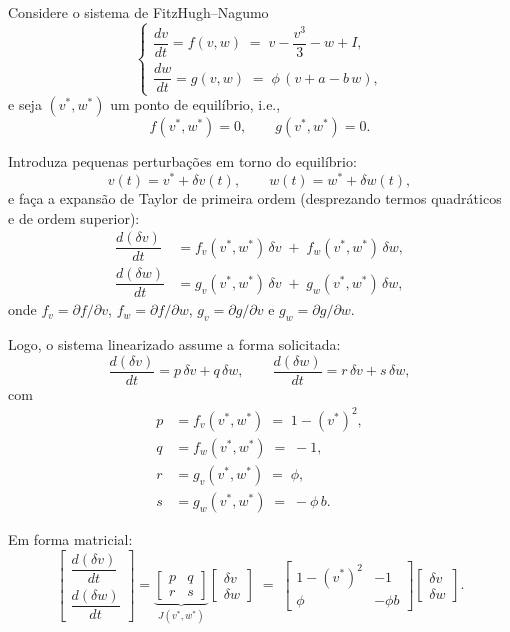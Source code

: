 \documentclass[english,11pt,a4paper]{article}
\begin{document}
	\noindent Considere o sistema de FitzHugh--Nagumo
	\[
	\begin{cases}
		\dfrac{dv}{dt} = f(v,w) \;=\; v - \dfrac{v^{3}}{3} - w + I,\\[4pt]
		\dfrac{dw}{dt} = g(v,w) \;=\; \phi\,(v + a - b\,w),
	\end{cases}
	\]
	e seja \((v^\ast,w^\ast)\) um ponto de equilíbrio, i.e.,
	\[
	f(v^\ast,w^\ast)=0, \qquad g(v^\ast,w^\ast)=0.
	\]
	
	\noindent Introduza pequenas perturbações em torno do equilíbrio:
	\[
	v(t)=v^\ast+\delta v(t), \qquad w(t)=w^\ast+\delta w(t),
	\]
	e faça a expansão de Taylor de primeira ordem (desprezando termos quadráticos e de ordem superior):
	\[
	\begin{aligned}
		\dfrac{d(\delta v)}{dt}
		&= f_v(v^\ast,w^\ast)\,\delta v \;+\; f_w(v^\ast,w^\ast)\,\delta w,\\[4pt]
		\dfrac{d(\delta w)}{dt}
		&= g_v(v^\ast,w^\ast)\,\delta v \;+\; g_w(v^\ast,w^\ast)\,\delta w,
	\end{aligned}
	\]
	onde \(f_v=\partial f/\partial v\), \(f_w=\partial f/\partial w\), \(g_v=\partial g/\partial v\) e \(g_w=\partial g/\partial w\).
	
	\noindent Logo, o sistema linearizado assume a forma solicitada:
	\[
	\dfrac{d(\delta v)}{dt} = p\,\delta v + q\,\delta w, 
	\qquad
	\dfrac{d(\delta w)}{dt} = r\,\delta v + s\,\delta w,
	\]
	com
	\[
	\boxed{
		\begin{aligned}
			p &= f_v(v^\ast,w^\ast) \;=\; 1 - (v^\ast)^2,\\[2pt]
			q &= f_w(v^\ast,w^\ast) \;=\; -1,\\[2pt]
			r &= g_v(v^\ast,w^\ast) \;=\; \phi,\\[2pt]
			s &= g_w(v^\ast,w^\ast) \;=\; -\phi\,b.
	\end{aligned}}
	\]
	
	\noindent Em forma matricial:
	\[
	\begin{bmatrix}
		\dfrac{d(\delta v)}{dt}\\[2pt]
		\dfrac{d(\delta w)}{dt}
	\end{bmatrix}
	=
	\underbrace{\begin{bmatrix}
			p & q\\
			r & s
	\end{bmatrix}}_{\displaystyle J(v^\ast,w^\ast)}
	\begin{bmatrix}
		\delta v\\[2pt]
		\delta w
	\end{bmatrix}
	\;=\;
	\begin{bmatrix}
		1-(v^\ast)^2 & -1\\
		\phi & -\phi b
	\end{bmatrix}
	\begin{bmatrix}
		\delta v\\[2pt]
		\delta w
	\end{bmatrix}.
	\]
	
\end{document}
